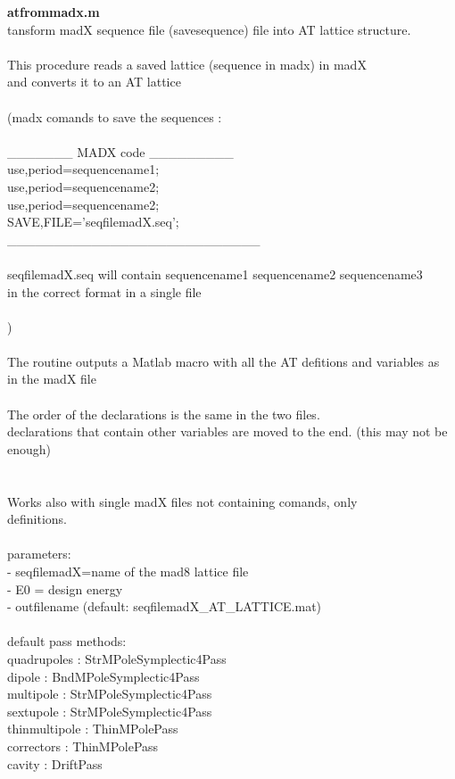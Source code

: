 \documentclass[a4paper,12pt]{report}
\begin{document}
{\bf atfrommadx.m}\\
  tansform madX sequence file (savesequence) file into AT lattice structure.\\
 \\
  This procedure reads a saved lattice (sequence in madx) in madX \\
  and converts it to an AT lattice\\
 \\
  (madx comands to save the sequences : \\
  \\
   \_\_\_\_\_\_\_ MADX code \_\_\_\_\_\_\_\_\_\\
   use,period=sequencename1; \\
   use,period=sequencename2; \\
   use,period=sequencename2; \\
   SAVE,FILE='seqfilemadX.seq';\\
   \_\_\_\_\_\_\_\_\_\_\_\_\_\_\_\_\_\_\_\_\_\_\_\_\_\_\_\\
 \\
   seqfilemadX.seq will contain sequencename1 sequencename2 sequencename3 \\
   in the correct format in a single file\\
  \\
  )\\
  \\
  The routine outputs a Matlab macro with all the AT defitions and variables as\\
  in the madX file  \\
 \\
  The order of the declarations is the same in the two files.\\
  declarations that contain other variables are moved to the end. (this may not be enough)\\
 \\
 \\
  Works also with single madX files not containing comands, only\\
  definitions.\\
 \\
  parameters:\\
     - seqfilemadX=name of the mad8 lattice file\\
     - E0  = design energy\\
     - outfilename (default: seqfilemadX\_AT\_LATTICE.mat)\\
     \\
  default pass methods:\\
           quadrupoles : StrMPoleSymplectic4Pass\\
           dipole : BndMPoleSymplectic4Pass\\
           multipole : StrMPoleSymplectic4Pass\\
           sextupole : StrMPoleSymplectic4Pass\\
           thinmultipole : ThinMPolePass\\
           correctors : ThinMPolePass\\
           cavity : DriftPass\\
 \\
\\
\end{document}
